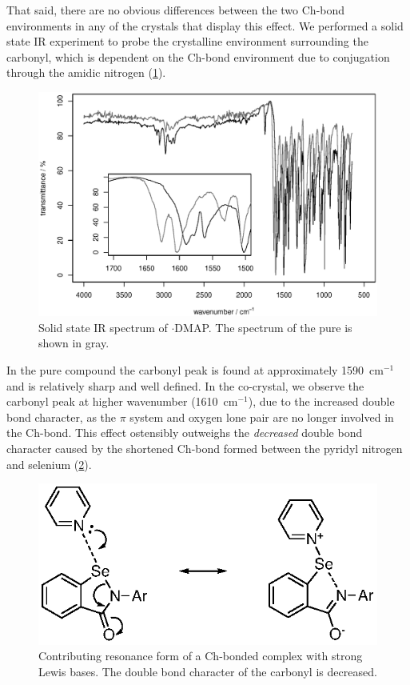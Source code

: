 \begin{refsection}
That said, there are no obvious differences between the two Ch-bond environments in any of the crystals that display this effect.
We performed a solid state IR experiment to probe the crystalline environment surrounding the carbonyl, which is dependent on the Ch-bond environment due to conjugation through the amidic nitrogen (\cref{fig:ebs-4oet-dmap-ir}).

\begin{figure}
    \centering
    \includegraphics[width=0.9\linewidth]{Figures/ebs-4oet-dmap-ir.eps}
    \caption{Solid state IR spectrum of $\cdot$DMAP. The spectrum of the pure  is shown in gray.}
    \label{fig:ebs-4oet-dmap-ir}
\end{figure}

In the pure compound the carbonyl peak is found at approximately 1590~cm$^{-1}$ and is relatively sharp and well defined.
In the co-crystal, we observe the carbonyl peak at higher wavenumber (1610~cm$^{-1}$), due to the increased double bond character, as the $\pi$ system and oxygen lone pair are no longer involved in the Ch-bond.
This effect ostensibly outweighs the \emph{decreased} double bond character caused by the shortened Ch-bond formed between the pyridyl nitrogen and selenium (\cref{fig:ch-bond-deloc}).

\begin{figure}
    \centering
    \includegraphics[scale=0.74]{Figures/ch-bond-deloc.eps}
    \caption{Contributing resonance form of a Ch-bonded complex with strong Lewis bases. The double bond character of the carbonyl is decreased.}
    \label{fig:ch-bond-deloc}
\end{figure}


\end{refsection}
